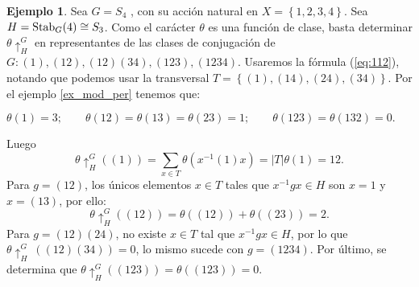 \documentclass[12pt]{book}
\theoremstyle{definition}
\newtheorem{example}[theorem]{Ejemplo}
\newcounter{in}
\begin{document}
\begin{example}
  Sea $G = S_4$ , con su acción natural en
  $X = \left \{ 1, 2, 3, 4 \right \}$. Sea
  $H = \textup{Stab}_{G}(4) \cong S_3$. Como el carácter $\theta$ es
  una función de clase, basta determinar $\theta\uparrow^{G}_{H}$ en
  representantes de las clases de conjugación de
  $G: (1), (12), (12)(34), (123), (1234)$.  Usaremos la fórmula
  (\ref{eq:112}), notando que podemos usar la transversal
  $T = \left \{ (1), (14), (24), (34) \right \}$.  Por el ejemplo
  \ref{ex_mod_per} tenemos que:
\begin{center}
     $\theta(1)=3; \qquad  \theta(12) = \theta(13) = \theta(23) = 1; \qquad \theta(123) = \theta(132) = 0.$
   \end{center}
Luego
\begin{equation}
\theta\uparrow^{G}_{H}((1)) = \sum_{x \in T} \theta(x^{-1}(1)x) = |T|\theta(1) = 12.
\end{equation}
Para $g = (12)$, los únicos elementos $x \in T$ tales que $x^{-1}gx \in H$ son $x = 1$ y $x = (13)$, por ello:
\begin{equation}
\theta\uparrow^{G}_{H}((12)) = \theta((12)) + \theta((23)) = 2.
\end{equation}
Para $g = (12)(24)$, no existe $x \in T$ tal que $x^{-1}gx \in H$, por lo que $\theta\uparrow^{G}_{H}~((12)(34)) = 0$, lo mismo sucede con $g = (1234)$. Por último, se determina que $\theta\uparrow^{G}_{H}((123)) = \theta((123)) = 0$.
\end{example}
\end{document}
